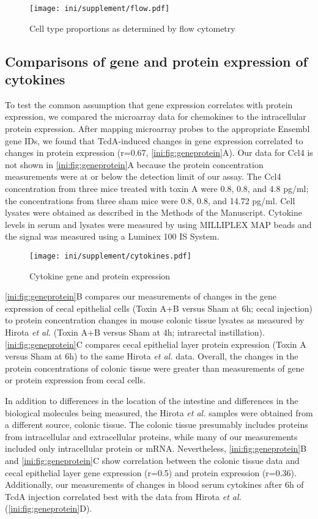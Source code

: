 \begin{figure}[h!]
  \centering
    \texttt{[image: ini/supplement/flow.pdf]}
  \caption{Cell type proportions as determined by flow cytometry}
  \label{ini:fig:flow}
\end{figure}

\subsection{Comparisons of gene and protein expression of cytokines}

To test the common assumption that gene expression correlates
with protein expression, we compared the microarray data for chemokines to the
intracellular protein expression. After mapping
microarray probes to the appropriate Ensembl gene IDs, we found that TcdA-induced 
changes in gene expression correlated to changes in protein 
expression (r=0.67, \autoref{ini:fig:geneprotein}A). Our data for Ccl4 is not shown
in \autoref{ini:fig:geneprotein}A because the protein concentration measurements
were at or below the detection limit of our assay. The Ccl4 concentration from
three mice treated with toxin A were 0.8, 0.8, and 4.8 pg/ml; the concentrations
from three sham mice were 0.8, 0.8, and 14.72 pg/ml. Cell 
lysates were obtained as described in the Methods of the Manuscript.
Cytokine levels in serum and lysates were measured by using
MILLIPLEX\textsuperscript{\textregistered{}}
MAP beads and the signal was measured using a Luminex 100 IS System.

\begin{figure}[ht]
\centering
\texttt{[image: ini/supplement/cytokines.pdf]}
\caption{Cytokine gene and protein expression}
\label{ini:fig:geneprotein}
\end{figure}

\autoref{ini:fig:geneprotein}B compares our measurements of changes in the gene expression 
of cecal epithelial cells (Toxin A+B versus Sham at 6h; cecal injection) 
to protein concentration changes 
in mouse colonic tissue lysates as measured by
Hirota \emph{et al.} (Toxin A+B versus Sham at 4h; intrarectal instillation).\autocite{Hirota2012}
\autoref{ini:fig:geneprotein}C compares cecal epithelial layer protein expression (Toxin A
versus Sham at 6h) to the same Hirota \emph{et al.} data.
Overall, the changes in the protein concentrations of colonic tissue were greater
than measurements of gene or protein expression from cecal cells. 

In addition to differences in the location of the intestine and 
differences in the biological molecules being measured, the 
Hirota \emph{et al.} samples were obtained from a different source, colonic tissue.
The colonic tissue presumably includes proteins from
intracellular and extracellular proteins, while many of our measurements included
only intracellular protein or mRNA. Nevertheless, \autoref{ini:fig:geneprotein}B
and \autoref{ini:fig:geneprotein}C show correlation between the colonic tissue
data and cecal epithelial layer gene expression (r=0.5) and protein
expression (r=0.36). Additionally, our measurements of changes in blood serum
cytokines after 6h of TcdA injection correlated best with the data from 
Hirota \emph{et al.} (\autoref{ini:fig:geneprotein}D).

